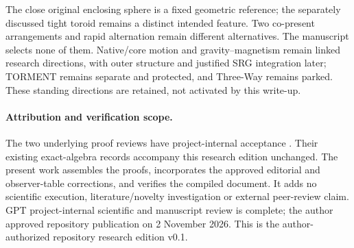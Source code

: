 The close original enclosing sphere is a fixed geometric reference; the separately discussed tight toroid remains a distinct intended feature. Two co-present arrangements and rapid alternation remain different alternatives. The manuscript selects none of them. Native/core motion and gravity--magnetism remain linked research directions, with outer structure and justified SRG integration later; TORMENT remains separate and protected, and Three-Way remains parked. These standing directions are retained, not activated by this write-up.

\paragraph{Attribution and verification scope.}
The two underlying proof reviews have project-internal acceptance \cite{phase,spatial}. Their existing exact-algebra records accompany this research edition unchanged. The present work assembles the proofs, incorporates the approved editorial and observer-table corrections, and verifies the compiled document. It adds no scientific execution, literature/novelty investigation or external peer-review claim. GPT project-internal scientific and manuscript review is complete; the author approved repository publication on 2 November 2026. This is the author-authorized repository research edition v0.1.
